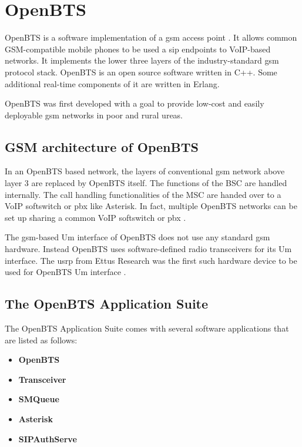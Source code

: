 \chapter{OpenBTS}

OpenBTS is a software implementation of a \gls{gsm} access point \cite{wikiOpenBTS}.
It allows common GSM-compatible mobile phones to be used a \gls{sip} endpoints to VoIP-based
networks. It implements the lower three layers of the industry-standard \gls{gsm}
protocol stack. OpenBTS is an open source software written in C++. Some 
additional real-time components of it are written in Erlang.

OpenBTS was first developed with a goal to provide low-cost and easily 
deployable \gls{gsm} networks in poor and rural ureas.

\section{GSM architecture of OpenBTS}
In an OpenBTS based network, the layers of conventional \gls{gsm} network above layer 3
are replaced by OpenBTS itself. The functions of the BSC are handled internally.
The call handling functionalities of the MSC are handed over to a VoIP 
softswitch or \gls{pbx} like Asterisk. In fact, multiple OpenBTS networks 
can be set up sharing a common VoIP softswitch or \gls{pbx} \cite{wikiOpenBTS}.

The \gls{gsm}-based Um interface of OpenBTS 
does not use any standard \gls{gsm} hardware. Instead OpenBTS uses software-defined
radio transceivers for its Um interface. The \gls{usrp} from Ettus Research was the
first such hardware device to be used for OpenBTS Um interface \cite{wikiOpenBTS}.



\section{The OpenBTS Application Suite}
The OpenBTS Application Suite comes with several software applications that 
are listed as follows:

\begin{itemize}
\item \textbf{OpenBTS}
\item \textbf{Transceiver}
\item \textbf{SMQueue}
\item \textbf{Asterisk}
\item \textbf{SIPAuthServe}
\end{itemize}

